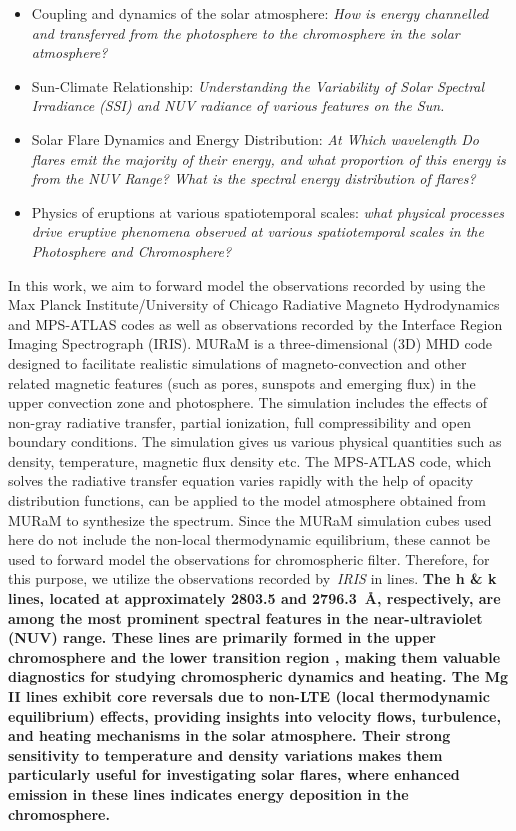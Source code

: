 \begin{itemize}
    \item Coupling and dynamics of the solar atmosphere: {\it How is energy channelled and transferred from the photosphere to the chromosphere in the solar atmosphere?}
    \item Sun-Climate Relationship: {\it Understanding the Variability of Solar Spectral Irradiance (SSI) and NUV radiance of various features on the Sun.}
    \item Solar Flare Dynamics and Energy Distribution: {\it At Which wavelength Do flares emit the majority of their energy, and what proportion of this energy is from the NUV Range? What is the spectral energy distribution of flares?}
    \item Physics of eruptions at various spatiotemporal scales: {\it what physical processes drive eruptive phenomena observed at various spatiotemporal scales in the Photosphere and Chromosphere?}
\end{itemize}

In this work, we aim to forward model the observations recorded by {\suit} using the Max Planck Institute/University of Chicago Radiative Magneto Hydrodynamics \citep[MURaM,][]{muram} and MPS-ATLAS codes as well as observations recorded by the Interface Region Imaging Spectrograph (IRIS). MURaM is a three-dimensional (3D) MHD code designed to facilitate realistic simulations of magneto-convection and other related magnetic features (such as pores, sunspots and emerging flux) in the upper convection zone and photosphere. The simulation includes the effects of non-gray radiative transfer, partial ionization, full compressibility and open boundary conditions. The simulation gives us various physical quantities such as density, temperature, magnetic flux density etc. The MPS-ATLAS \citep{witzke12} code, which solves the radiative transfer equation varies rapidly with the help of opacity distribution functions, can be applied to the model atmosphere obtained from MURaM to synthesize the spectrum. Since the MURaM simulation cubes used here do not include the non-local thermodynamic equilibrium, these cannot be used to forward model the observations for chromospheric filter. Therefore, for this purpose, we utilize the observations recorded by~{\it IRIS} in  lines. {\bf The  h \& k lines, located at approximately 2803.5 and 2796.3~{\AA}, respectively, are among the most prominent spectral features in the near-ultraviolet (NUV) range. These lines are primarily formed in the upper chromosphere and the lower transition region \citep{leenarts13a, leenarts13b}, making them valuable diagnostics for studying chromospheric dynamics and heating. The Mg II lines exhibit core reversals due to non-LTE (local thermodynamic equilibrium) effects, providing insights into velocity flows, turbulence, and heating mechanisms in the solar atmosphere. Their strong sensitivity to temperature and density variations makes them particularly useful for investigating solar flares, where enhanced emission in these lines indicates energy deposition in the chromosphere.}

